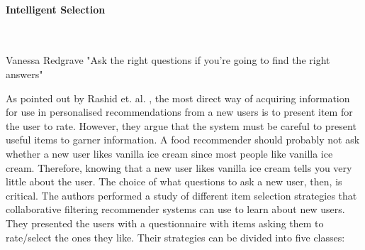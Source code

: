 

\paragraph{Intelligent Selection}\mbox{}\\


\begin{chapquote}[30pt]{Vanessa Redgrave}
  "Ask the right questions if you're going to find the right answers"
\end{chapquote}

As pointed out by Rashid et. al. \cite{Rashid2002}, the most direct way of acquiring information for use in personalised recommendations from a new users is to present item for the user to rate. However, they argue that the system must be careful to present useful items to garner information. A food recommender should probably not ask whether a new user likes vanilla ice cream since most people like vanilla ice cream. Therefore, knowing that a new user likes vanilla ice cream tells you very little about the user. The choice of what questions to ask a new user, then, is critical. The authors performed a study of different item selection strategies that collaborative filtering recommender systems can use to learn about new users. They presented the users with a questionnaire with items asking them to rate/select the ones they like. Their strategies can be divided into five classes:


